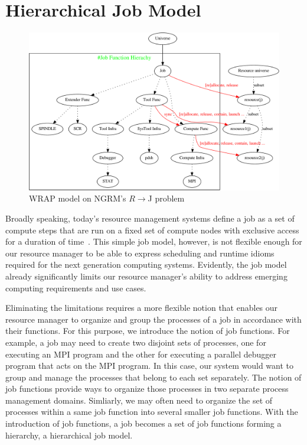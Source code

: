 \documentclass[10pt]{article}
\begin{document}
\section{Hierarchical Job Model}
\begin{figure}
  \centering
    \includegraphics[width=5.0in]{fig/wrap_graph}
  \caption{WRAP model on NGRM's $R \rightarrow $J problem}
  \label{fig:jobrm}
\end{figure}

Broadly speaking, today's resource management systems define a job as a set 
of compute steps that are run on a fixed set of compute nodes with exclusive access for 
a duration of time~\cite{Jette02slurm}. 
This simple job model, however, is not flexible enough for our resource manager to
be able to express scheduling and runtime idioms required for the next generation computing systems. 
Evidently, the job model already significantly limits 
our resource manager's ability to address emerging 
computing requirements and use cases.  

Eliminating the limitations requires a more flexible notion that enables
our resource manager to organize and group the processes of a job
in accordance with their functions. For this purpose,
we introduce the notion of job functions. For example, 
a job may need to create two disjoint sets of processes, 
one for executing an MPI program and 
the other for executing a parallel debugger program 
that acts on the MPI program. 
In this case, our system would want to group and manage the processes 
that belong to each set separately. The notion of job functions
provide ways to organize those processes in two separate process management
domains. Simliarly, we may often need to organize 
the set of processes within a same job function
into several smaller job functions. With the introduction of job functions, 
a job becomes a set of job functions forming a hierarchy,
a hierarchical job model.
\end{document}
